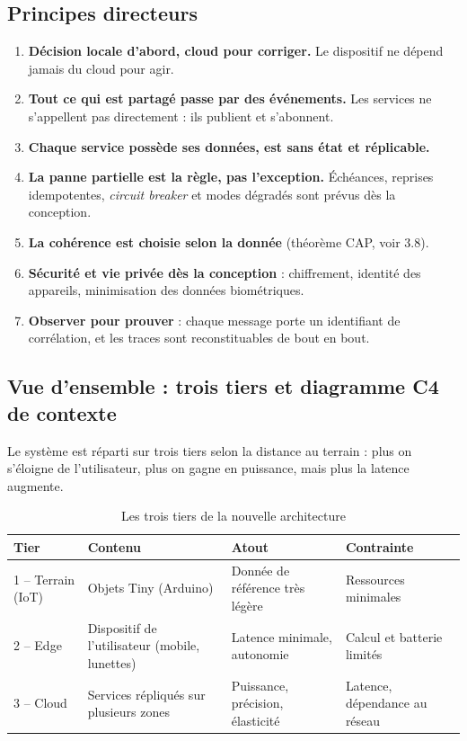 \documentclass[11pt,a4paper]{article}
\begin{document}
\subsection{Principes directeurs}

\begin{enumerate}
    \item \textbf{Décision locale d'abord, cloud pour corriger.} Le dispositif ne dépend jamais du cloud pour agir.
    \item \textbf{Tout ce qui est partagé passe par des événements.} Les services ne s'appellent pas directement : ils publient et s'abonnent.
    \item \textbf{Chaque service possède ses données, est sans état et réplicable.}
    \item \textbf{La panne partielle est la règle, pas l'exception.} Échéances, reprises idempotentes, \textit{circuit breaker} et modes dégradés sont prévus dès la conception.
    \item \textbf{La cohérence est choisie selon la donnée} (théorème CAP, voir 3.8).
    \item \textbf{Sécurité et vie privée dès la conception} : chiffrement, identité des appareils, minimisation des données biométriques.
    \item \textbf{Observer pour prouver} : chaque message porte un identifiant de corrélation, et les traces sont reconstituables de bout en bout.
\end{enumerate}

\subsection{Vue d'ensemble : trois tiers et diagramme C4 de contexte}

Le système est réparti sur trois tiers selon la distance au terrain : plus on s'éloigne de l'utilisateur, plus on gagne en puissance, mais plus la latence augmente.

\begin{table}[h]
\centering
\begin{tabular}{|p{2.6cm}|p{4.3cm}|p{3.9cm}|p{3.5cm}|}
\hline
\textbf{Tier} & \textbf{Contenu} & \textbf{Atout} & \textbf{Contrainte} \\
\hline
1 -- Terrain (IoT) & Objets Tiny (Arduino) & Donnée de référence très légère & Ressources minimales \\
\hline
2 -- Edge & Dispositif de l'utilisateur (mobile, lunettes) & Latence minimale, autonomie & Calcul et batterie limités \\
\hline
3 -- Cloud & Services répliqués sur plusieurs zones & Puissance, précision, élasticité & Latence, dépendance au réseau \\
\hline
\end{tabular}
\caption{Les trois tiers de la nouvelle architecture}
\end{table}
\end{document}
